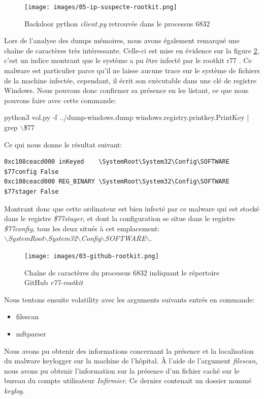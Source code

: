 \documentclass[a4paper]{article}
\begin{document}
\begin{figure}[H]
    \centering
    \texttt{[image: images/05-ip-suspecte-rootkit.png]}
    \caption{Backdoor python \textit{client.py} retrouvée dans le processus 6832}
    \label{fig:ip-rootkit}
\end{figure}

Lors de l'analyse des dumps mémoires, nous avons également remarqué une chaîne de caractères très intéressante. Celle-ci est mise en évidence sur la figure \ref{fig:github-rootkit}, c'est un indice montrant que le système a pu être infecté par le rootkit r77 \cite{3}. Ce malware est particulier parce qu'il ne laisse aucune trace sur le système de fichiers de la machine infectée, cependant, il écrit son exécutable dans une clé de registre Windows. Nous pouvons donc confirmer sa présence en les listant, ce que nous pouvons faire avec cette commande:
\begin{example}
    python3 vol.py -f ../dump-windows.dump windows.registry.printkey.PrintKey | grep $\backslash$\$77
\end{example}
Ce qui nous donne le résultat suivant:
\begin{example}
\begin{Verbatim}[fontsize=\footnotesize]
0xc108ceacd000 inKeyed    \SystemRoot\System32\Config\SOFTWARE $77config False
0xc108ceacd000 REG_BINARY \SystemRoot\System32\Config\SOFTWARE $77stager False
\end{Verbatim}
\end{example}
Montrant donc que cette ordinateur est bien infecté par ce malware qui est stocké dans le registre \textit{\$77stager}, et dont la configuration se situe dans le registre \textit{\$77config}, tous les deux situés à cet emplacement: \\
\textit{$\backslash$SystemRoot$\backslash$System32$\backslash$Config$\backslash$SOFTWARE$\backslash$}.

\begin{figure}[H]
    \centering
    \texttt{[image: images/03-github-rootkit.png]}
    \caption{Chaîne de caractères du processus 6832 indiquant le répertoire GitHub \textit{r77-rootkit}}
    \label{fig:github-rootkit}
\end{figure}

Nous tentons ensuite volatility avec les arguments suivants entrés en commande:
\begin{itemize}
    \item filescan
    \item mftparser\\
\end{itemize}
Nous avons pu obtenir des informations concernant la présence et la localisation du malware keylogger sur la machine de l'hôpital. À l'aide de l'argument \textit{filescan}, nous avons pu obtenir l'information sur la présence d'un fichier caché sur le bureau du compte utilisateur \textit{Infirmier}. Ce dernier contenait un dossier nommé \textit{keylog}.
\end{document}
